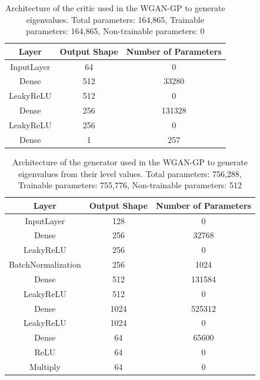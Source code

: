 \documentclass[11pt,a4paper,twoside]{report}
\begin{document}
\begin{table}[]
  \centering
  \begin{tabular}{c c c}
      \hline
      \textbf{Layer} & \textbf{Output Shape} & \textbf{Number of Parameters} \\ \hline
      InputLayer            & 64            & 0                 \\
      Dense                 & 512           & 33280             \\
      LeakyReLU             & 512           & 0                 \\
      Dense                 & 256           & 131328            \\
      LeakyReLU             & 256           & 0                 \\
      Dense                 & 1             & 257               \\
  \end{tabular}
  \caption{Architecture of the critic used in the WGAN-GP to generate eigenvalues. Total parameters: 164,865, Trainable parameters: 164,865, Non-trainable parameters: 0}
  \label{tab:evals_critic_WGANGP_architecture}
\end{table}

\begin{table}[]
  \centering
  \begin{tabular}{c c c}
      \hline
      \textbf{Layer} & \textbf{Output Shape} & \textbf{Number of Parameters} \\ \hline
      InputLayer            & 128           & 0                 \\
      Dense                 & 256           & 32768             \\
      LeakyReLU             & 256           & 0                 \\
      BatchNormalization    & 256           & 1024              \\
      Dense                 & 512           & 131584            \\
      LeakyReLU             & 512           & 0                 \\
      Dense                 & 1024          & 525312            \\
      LeakyReLU             & 1024          & 0                 \\
      Dense                 & 64            & 65600             \\
      ReLU                  & 64            & 0                 \\
      Multiply              & 64            & 0                 \\
  \end{tabular}
  \caption{Architecture of the generator used in the WGAN-GP to generate eigenvalues from their level values. Total parameters: 756,288, Trainable parameters: 755,776, Non-trainable parameters: 512}
  \label{tab:evals_dB_generator_WGANGP_architecture}
\end{table}
\end{document}
